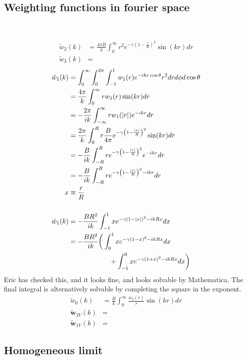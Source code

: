\documentclass[letterpaper,twocolumn,amsmath,amssymb,prb]{revtex4-1}
\begin{document}
\subsection{Weighting functions in fourier space}\

\begin{align}
  \tilde{w}_2(k) &= \frac{4\pi B}{k} \int_{0}^{\infty} r^2 
   e^{-\gamma \left(1- \frac{r}{R} \right)^2} \sin(kr) dr \\
  \tilde{w}_3(k) &=
\end{align}
\begin{align}
  \tilde{w}_1(k) &= \int_0^\infty \int_0^{2\pi} \int_{-1}^{1} w_1(r)
           e^{-ikr\cos\theta} r^2drd\phi d\cos\theta
    \\
    &= \frac{4\pi}{k} \int_0^\infty r w_1(r) \sin(kr) dr
    \\
    &= -\frac{2\pi}{ik} \int_{-\infty}^\infty r w_1(|r|) e^{-ikr} dr
    \\
    &= \frac{2\pi}{k} \int_0^{R} r \frac{B}{4\pi} e^{-\gamma\left(1-\frac{|r|}{R}\right)^2} \sin(kr) dr
    \\
    &= -\frac{B}{ik} \int_{-R}^{R} r e^{-\gamma\left(1-\frac{|r|}{R}\right)^2} e^{-ikr} dr
    \\
    &= -\frac{B}{ik} \int_{-R}^{R} r
    e^{-\gamma\left(1-\frac{|r|}{R}\right)^2 - ikr} dr
    \\
    x &\equiv \frac{r}{R} \\
    \\
    \tilde{w}_1(k) &=
    -\frac{BR^2}{ik} \int_{-1}^{1} x
    e^{-\gamma\left(1-|x|\right)^2 - ikRx} dx
    \\
    &=
    -\frac{BR^2}{ik}
    \bigg(
    \int_{0}^{1} x e^{-\gamma\left(1-x\right)^2 - ikRx} dx
    \notag\\&\quad\quad\quad\quad\quad\quad+
    \int_{-1}^{0} x e^{-\gamma\left(1+x\right)^2 - ikRx} dx
    \bigg)
\end{align}
Eric has checked this, and it looks fine, and looks solvable by
Mathematica.  The final integral is alternatively solvable by
completing the square in the exponent.
\begin{align}
  \tilde{w}_0(k) &= \frac{B}{k} \int_0^\infty \frac{w_2(r)}{r} \sin(kr) dr
    \\
  \mathbf{\tilde{w}}_{2V}(k) &= \\
  \mathbf{\tilde{w}}_{1V}(k) &= 
\end{align}

\subsection{Homogeneous limit}
\end{document}
